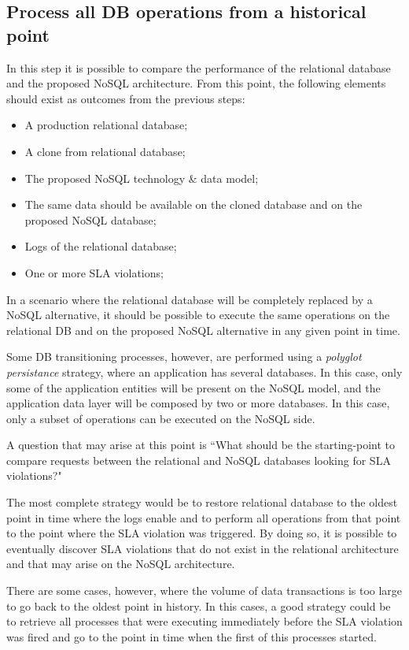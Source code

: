 \subsection{Process all DB operations from a historical point}

In this step it is possible to compare the performance of the relational database and the proposed NoSQL architecture. From this point, the following elements should exist as outcomes from the previous steps: 

\begin{itemize}
\item{A production relational database;}
\item{A clone from relational database;}
\item{The proposed NoSQL technology \& data model;}
\item{The same data should be available on the cloned database and on the proposed NoSQL database;}
\item{Logs of the relational database;}
\item{One or more SLA violations;}
\end{itemize}

In a scenario where the relational database will be completely replaced by a NoSQL alternative, it should be possible to execute the same operations on the relational DB and on the proposed NoSQL alternative in any given point in time.

Some DB transitioning processes, however, are performed using a \textit{polyglot persistance} strategy, where an application has several databases. In this case, only some of the application entities will be present on the NoSQL model, and the application data layer will be composed by two or more databases. In this case, only a subset of operations can be executed on the NoSQL side.

A question that may arise at this point is ``What should be the starting-point to compare requests between the relational and NoSQL databases looking for SLA violations?" 

The most complete strategy would be to restore relational database to the oldest point in time where the logs enable and to perform all operations from that point to the point where the SLA violation was triggered. By doing so, it is possible to eventually discover SLA violations that do not exist in the relational architecture and that may arise on the NoSQL architecture.

There are some cases, however, where the volume of data transactions is too large to go back to the oldest point in history. In this cases, a good strategy could be to retrieve all processes that were executing immediately before the SLA violation was fired and go to the point in time when the first of this processes started. 

